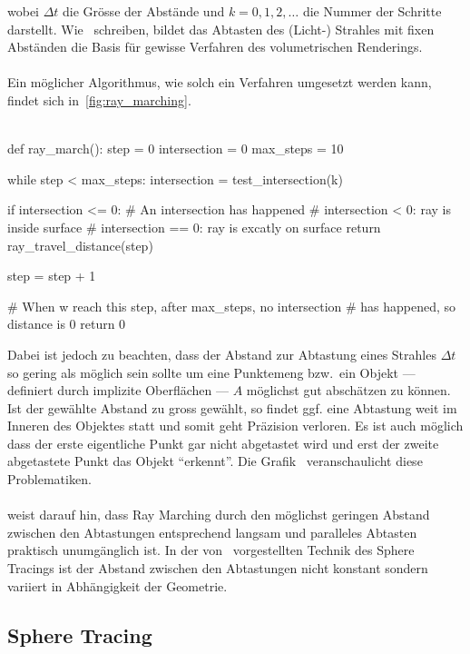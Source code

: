 wobei $\Delta t$ die Grösse der Abstände und $k = 0,1,2,\dots$ die Nummer der
Schritte darstellt. Wie~\cite{hart_ray_1989} schreiben, bildet das Abtasten des
(Licht-) Strahles mit fixen Abständen die Basis für gewisse Verfahren des
volumetrischen Renderings.\\
\\
Ein möglicher Algorithmus, wie solch ein Verfahren umgesetzt werden kann,
findet sich in~\ref{fig:ray_marching}.\\
\\
\begin{python}[caption={Eine abstrakte Umsetzung des Ray
        Marchings\protect\footnotemark}.,label={fig:ray_marching},captionpos=b]
def ray_march():
    step         = 0
    intersection = 0
    max_steps    = 10

    while step < max_steps:
        intersection = test_intersection(k)

        if intersection <= 0:
            # An intersection has happened
            #   intersection <  0: ray is inside surface
            #   intersection == 0: ray is excatly on surface
            return ray_travel_distance(step)

        step = step + 1

    # When w reach this step, after max_steps, no intersection
    # has happened, so distance is 0
    return 0
\end{python}

Dabei ist jedoch zu beachten, dass der Abstand zur Abtastung eines Strahles
$\Delta t$ so gering als möglich sein sollte um eine Punktemeng bzw.\ ein
Objekt --- definiert durch implizite Oberflächen --- $A$ möglichst gut
abschätzen zu können. Ist der gewählte Abstand zu gross gewählt, so findet ggf.
eine Abtastung weit im Inneren des Objektes statt und somit geht Präzision
verloren.  Es ist auch möglich dass der erste eigentliche Punkt gar nicht
abgetastet wird und erst der zweite abgetastete Punkt das Objekt ``erkennt''.
Die Grafik~ veranschaulicht diese
Problematiken.\\
\\
\cite{hart_sphere_1994} weist darauf hin, dass Ray Marching durch den möglichst
geringen Abstand zwischen den Abtastungen entsprechend langsam und paralleles
Abtasten praktisch unumgänglich ist. In der von~\cite{hart_sphere_1994}
vorgestellten Technik des Sphere Tracings ist der Abstand zwischen den
Abtastungen nicht konstant sondern variiert in Abhängigkeit der Geometrie.

\subsection{Sphere Tracing}
\label{subsec:sphere_tracing}

